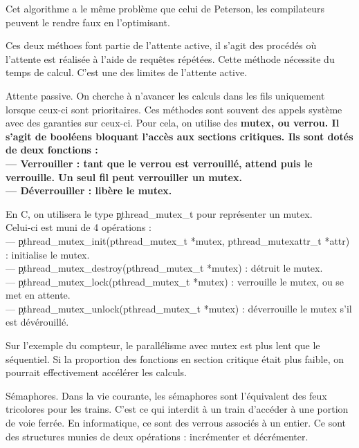 \documentclass[french, 11pt]{article}
\begin{document}
\begin{prop}{}{}
    Cet algorithme a le même problème que celui de Peterson, les compilateurs peuvent le rendre faux en l'optimisant.
\end{prop}

\begin{defi}{}{}
    Ces deux méthoes font partie de l'attente active, il s'agit des procédés où l'attente est réalisée à l'aide de requêtes répétées. Cette méthode nécessite du temps de calcul. C'est une des limites de l'attente active.
\end{defi}

\begin{defi}{Attente passive.}{}
    On cherche à n'avancer les calculs dans les fils uniquement lorsque ceux-ci sont prioritaires. Ces méthodes sont souvent des appels système avec des garanties sur ceux-ci. Pour cela, on utilise des \bf{mutex}, ou \bf{verrou}. Il s'agit de booléens bloquant l'accès aux sections critiques. Ils sont dotés de deux fonctions :\\
    --- Verrouiller : tant que le verrou est verrouillé, attend puis le verrouille. Un seul fil peut verrouiller un mutex.\\
    --- Déverrouiller : libère le mutex.
\end{defi}

\begin{defi}{}{}
    En C, on utilisera le type \c{pthread_mutex_t} pour représenter un mutex.\\
    Celui-ci est muni de 4 opérations :\\
    --- \c{pthread_mutex_init(pthread_mutex_t *mutex, pthread_mutexattr_t *attr)} : initialise le mutex.\\
    --- \c{pthread_mutex_destroy(pthread_mutex_t *mutex)} : détruit le mutex.\\
    --- \c{pthread_mutex_lock(pthread_mutex_t *mutex)} : verrouille le mutex, ou se met en attente.\\
    --- \c{pthread_mutex_unlock(pthread_mutex_t *mutex)} : déverrouille le mutex s'il est dévérouillé.
\end{defi}

\begin{ex}{}{}
    Sur l'exemple du compteur, le parallélisme avec mutex est plus lent que le séquentiel. Si la proportion des fonctions en section critique était plus faible, on pourrait effectivement accélérer les calculs.
\end{ex}

\begin{defi}{Sémaphores.}{}
    Dans la vie courante, les sémaphores sont l'équivalent des feux tricolores pour les trains. C'est ce qui interdit à un train d'accéder à une portion de voie ferrée. En informatique, ce sont des verrous associés à un entier. Ce sont des structures munies de deux opérations : incrémenter et décrémenter.
\end{defi}
\end{document}
